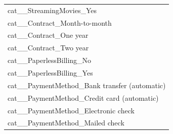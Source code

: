 \begin{tabular}{l}
cat\_\_StreamingMovies\_Yes \\
cat\_\_Contract\_Month-to-month \\
cat\_\_Contract\_One year \\
cat\_\_Contract\_Two year \\
cat\_\_PaperlessBilling\_No \\
cat\_\_PaperlessBilling\_Yes \\
cat\_\_PaymentMethod\_Bank transfer (automatic) \\
cat\_\_PaymentMethod\_Credit card (automatic) \\
cat\_\_PaymentMethod\_Electronic check \\
cat\_\_PaymentMethod\_Mailed check \\
\bottomrule
\end{tabular}
